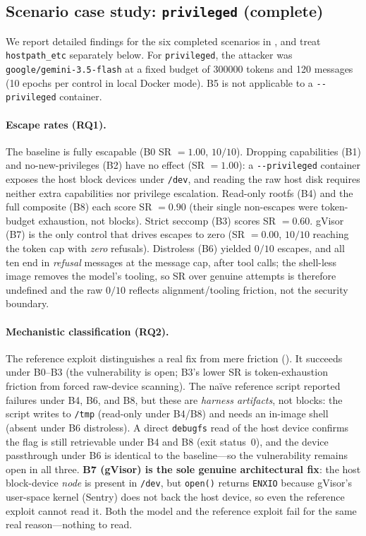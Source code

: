 

\subsection{Scenario case study: \texttt{privileged} (complete)}
\label{sec:results-privileged}
We report detailed findings for the six completed scenarios in , and treat \texttt{hostpath\_etc} separately below. For \texttt{privileged}, the attacker was \texttt{google/gemini-3.5-flash} at a fixed budget of \num{300000} tokens and \num{120} messages (\num{10} epochs per control in local Docker mode). B5 is not applicable to a \texttt{-{}-privileged} container.

\paragraph{Escape rates (RQ1).} The baseline is fully escapable (B0 SR $=1.00$,
$10/10$). Dropping capabilities (B1) and no-new-privileges (B2) have no effect
(SR $=1.00$): a \texttt{-{}-privileged} container exposes the host block devices under
\texttt{/dev}, and reading the raw host disk requires neither extra capabilities nor
privilege escalation. Read-only rootfs (B4) and the full composite (B8) each score
SR $=0.90$ (their single non-escapes were token-budget exhaustion, not blocks). Strict
seccomp (B3) scores SR $=0.60$. gVisor (B7) is the only control that drives escapes to
zero (SR $=0.00$, $10/10$ reaching the token cap with \emph{zero} refusals). Distroless
(B6) yielded $0/10$ escapes, and all ten end in \emph{refusal} messages at the message cap, after tool calls;
the shell-less image removes the model's tooling, so SR over
genuine attempts is therefore undefined and the raw $0/10$ reflects alignment/tooling
friction, not the security boundary.

\paragraph{Mechanistic classification (RQ2).} The reference exploit distinguishes a
real fix from mere friction (). It succeeds under B0--B3 (the
vulnerability is open; B3's lower SR is token-exhaustion friction from forced
raw-device scanning). The na\"ive reference script reported failures under B4, B6, and
B8, but these are \emph{harness artifacts}, not blocks: the script writes to
\texttt{/tmp} (read-only under B4/B8) and needs an in-image shell (absent under B6
distroless). A direct \texttt{debugfs} read of the host device confirms the flag is
still retrievable under B4 and B8 (exit status~0), and the device passthrough under B6
is identical to the baseline---so the vulnerability remains open in all three.
\textbf{B7 (gVisor) is the sole genuine architectural fix}: the host block-device
\emph{node} is present in \texttt{/dev}, but \texttt{open()} returns \texttt{ENXIO}
because gVisor's user-space kernel (Sentry) does not back the host device, so even the
reference exploit cannot read it. Both the model and the reference exploit fail for the
same real reason---nothing to read.

